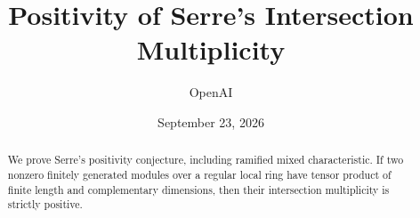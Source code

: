 \documentclass[11pt]{article}
\title{Positivity of Serre's Intersection Multiplicity}
\author{OpenAI}
\date{September 23, 2026}
\numberwithin{equation}{section}
\theoremstyle{definition}
\theoremstyle{remark}
\begin{document}
\maketitle
\begin{abstract}
We prove Serre's positivity conjecture, including ramified mixed
characteristic. If two nonzero finitely generated modules over a regular local
ring have tensor product of finite length and complementary dimensions, then
their intersection multiplicity is strictly positive.
\end{abstract}







\end{document}
